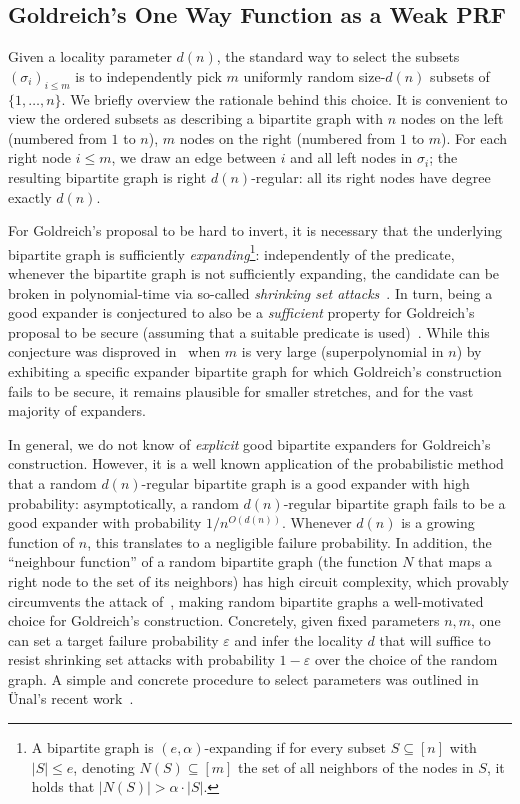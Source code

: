 \subsection{Goldreich's One Way Function as a Weak PRF}

Given a locality parameter $d(n)$, the standard way to select the subsets $(\sigma_i)_{i\leq m}$ is to independently pick $m$ uniformly random size-$d(n)$ subsets of $\{1,\dots, n\}$. We briefly overview the rationale behind this choice. It is convenient to view the ordered subsets as describing a bipartite graph with $n$ nodes on the left (numbered from $1$ to $n$), $m$ nodes on the right (numbered from $1$ to $m$). For each right node $i \leq m$, we draw an edge between $i$ and all left nodes in $\sigma_i$; the resulting bipartite graph is right $d(n)$-regular: all its right nodes have degree exactly $d(n)$. 

For Goldreich's proposal to be hard to invert, it is necessary that the underlying bipartite graph is sufficiently \emph{expanding}\footnote{A bipartite graph is $(e,\alpha)$-expanding if for every subset $S\subseteq [n]$ with $|S| \leq e$, denoting $N(S) \subseteq [m]$ the set of all neighbors of the nodes in $S$, it holds that $|N(S)| > \alpha \cdot |S|$.}: independently of the predicate, whenever the bipartite graph is not sufficiently expanding, the candidate can be broken in polynomial-time via so-called \emph{shrinking set attacks}~\cite{applebaum2008pseudorandom,zichron2017locally}. In turn, being a good expander is conjectured to also be a \emph{sufficient} property for Goldreich's proposal to be secure (assuming that a suitable predicate is used)~\cite{TCC:AppRay16b}. While this conjecture was disproved in~\cite{ITCS:OliSanTel19} when $m$ is very large (superpolynomial in $n$) by exhibiting a specific expander bipartite graph for which Goldreich's construction fails to be secure, it remains plausible for smaller stretches, and for the vast majority of expanders.

In general, we do not know of \emph{explicit} good bipartite expanders for Goldreich's construction. However, it is a well known application of the probabilistic method that a random $d(n)$-regular bipartite graph is a good expander with high probability: asymptotically, a random $d(n)$-regular bipartite graph fails to be a good expander with probability $1/n^{O(d(n))}$. Whenever $d(n)$ is a growing function of $n$, this translates to a negligible failure probability. In addition, the ``neighbour function'' of a random bipartite graph (the function $N$ that maps a right node to the set of its neighbors) has high circuit complexity, which provably circumvents the attack of~\cite{ITCS:OliSanTel19}, making random bipartite graphs a well-motivated choice for Goldreich's construction. Concretely, given fixed parameters $n,m$, one can set a target failure probability $\varepsilon$ and infer the locality $d$ that will suffice to resist shrinking set attacks with probability $1-\varepsilon$ over the choice of the random graph. A simple and concrete procedure to select parameters was outlined in Ünal's recent work~\cite{EPRINT:Unal23b}.

